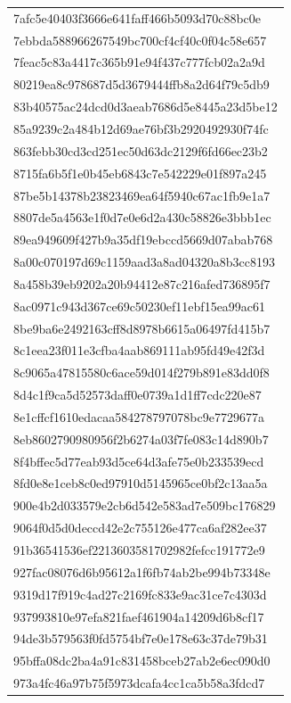 \begin{tabular}{l}
7afc5e40403f3666e641faff466b5093d70c88bc0e \\
7ebbda588966267549bc700cf4cf40c0f04c58e657 \\
7feac5c83a4417c365b91e94f437c777fcb02a2a9d \\
80219ea8c978687d5d3679444ffb8a2d64f79c5db9 \\
83b40575ac24dcd0d3aeab7686d5e8445a23d5be12 \\
85a9239c2a484b12d69ae76bf3b2920492930f74fc \\
863febb30cd3cd251ec50d63dc2129f6fd66ec23b2 \\
8715fa6b5f1e0b45eb6843c7e542229e01f897a245 \\
87be5b14378b23823469ea64f5940c67ac1fb9e1a7 \\
8807de5a4563e1f0d7e0e6d2a430c58826e3bbb1ec \\
89ea949609f427b9a35df19ebccd5669d07abab768 \\
8a00c070197d69c1159aad3a8ad04320a8b3cc8193 \\
8a458b39eb9202a20b94412e87c216afed736895f7 \\
8ac0971c943d367ce69c50230ef11ebf15ea99ac61 \\
8be9ba6e2492163cff8d8978b6615a06497fd415b7 \\
8c1eea23f011e3cfba4aab869111ab95fd49e42f3d \\
8c9065a47815580c6ace59d014f279b891e83dd0f8 \\
8d4c1f9ca5d52573daff0e0739a1d1ff7cdc220e87 \\
8e1cffcf1610edacaa584278797078bc9e7729677a \\
8eb8602790980956f2b6274a03f7fe083c14d890b7 \\
8f4bffec5d77eab93d5ce64d3afe75e0b233539ecd \\
8fd0e8e1ceb8c0ed97910d5145965ce0bf2c13aa5a \\
900e4b2d033579e2cb6d542e583ad7e509bc176829 \\
9064f0d5d0deccd42e2c755126e477ca6af282ee37 \\
91b36541536ef2213603581702982fefcc191772e9 \\
927fac08076d6b95612a1f6fb74ab2be994b73348e \\
9319d17f919c4ad27c2169fc833e9ac31ce7c4303d \\
937993810e97efa821faef461904a14209d6b8cf17 \\
94de3b579563f0fd5754bf7e0e178e63c37de79b31 \\
95bffa08dc2ba4a91c831458bceb27ab2e6ec090d0 \\
973a4fc46a97b75f5973dcafa4cc1ca5b58a3fdcd7 \\

\end{tabular}
